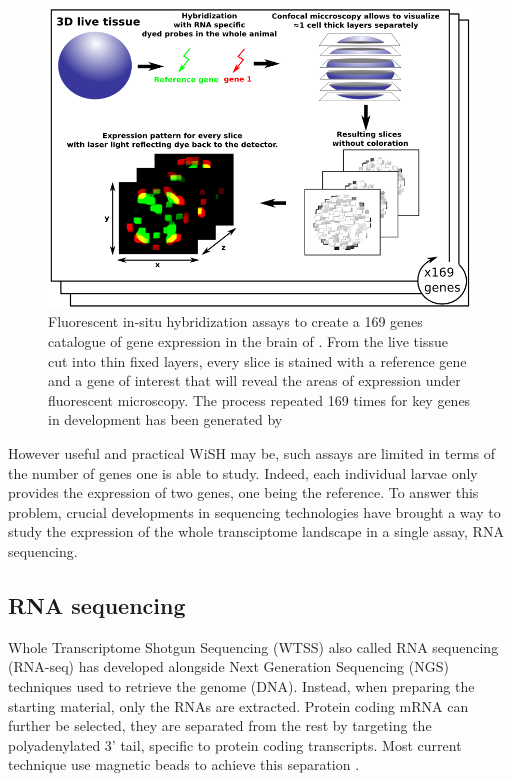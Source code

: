     \begin{figure}[bth]
\centerline{\includegraphics[width=0.9\linewidth]{gfx/chapter1/insitu.png}}
\caption{Fluorescent in-situ hybridization assays to create a 169 genes catalogue of gene expression in the brain of \platy{}. From the live tissue cut into thin fixed layers, every slice is stained with a reference gene and a gene of interest that will reveal the areas of expression under fluorescent microscopy. The process repeated 169 times for key genes in \platy{} development has been generated by \cite{Tomer10}}\label{fig:insitu}
	\end{figure}
	
	However useful and practical WiSH may be, such assays are limited in terms of the number of genes one is able to study. Indeed, each individual larvae only provides the expression of two genes, one being the reference. To answer this problem, crucial developments in sequencing technologies have brought a way to study the expression of the whole transciptome landscape in a single assay, RNA sequencing.

     \subsection{RNA sequencing}
     Whole Transcriptome Shotgun Sequencing (WTSS) also called RNA sequencing (RNA-seq) \cite{morin08,wang09} has developed alongside Next Generation Sequencing (NGS) techniques used to retrieve the genome (DNA). Instead, when preparing the starting material, only the RNAs are extracted. Protein coding mRNA can further be selected, they are separated from the rest by targeting the polyadenylated 3' tail, specific to protein coding transcripts. Most current technique use magnetic beads to achieve this separation \cite{mortazavi08,morin08}.\\
     
